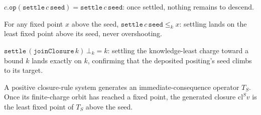 \begin{theorem}\label{thm:settle-fixed}\leanok{}
$c.\texttt{op}(\texttt{settle}\,c\,\texttt{seed}) = \texttt{settle}\,c\,\texttt{seed}$:
once settled, nothing remains to descend.
\end{theorem}
\begin{theorem}\label{thm:settle-least}\leanok{}
For any fixed point $x$ above the seed, $\texttt{settle}\,c\,\texttt{seed} \le_k x$:
settling lands on the least fixed point above its seed, never overshooting.
\end{theorem}
\begin{theorem}\label{thm:settle-kbot}\leanok{}
$\texttt{settle}\,(\texttt{joinClosure}\,k)\,\bot_k = k$: settling the
knowledge-least charge toward a bound $k$ lands exactly on $k$, confirming that
the deposited positing's seed climbs to its target.
\end{theorem}

\begin{theorem}\label{thm:closure-rule-lfp}\leanok{}
A positive closure-rule system generates an immediate-consequence operator
$T_S$. Once its finite-charge orbit has reached a fixed point, the generated
closure $\mathrm{cl}^S v$ is the least fixed point of $T_S$ above the seed.
\end{theorem}
